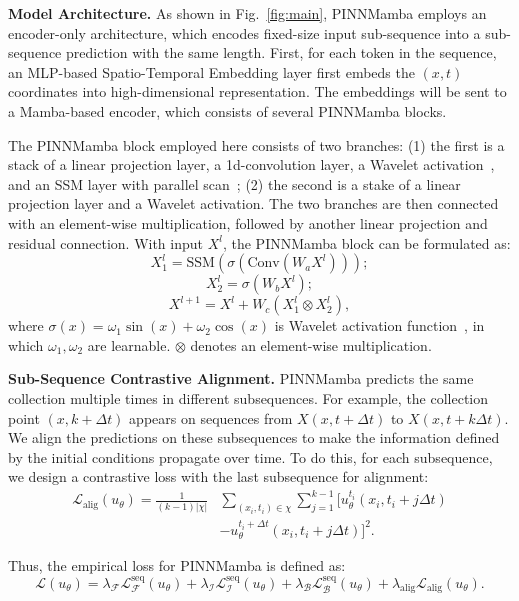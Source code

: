 \textbf{Model Architecture.} As shown in Fig.~\ref{fig:main}, PINNMamba employs an encoder-only architecture, which encodes fixed-size input sub-sequence into a sub-sequence prediction with the same length. First, for each token in the sequence, an MLP-based Spatio-Temporal Embedding layer first embeds the $(x,t)$ coordinates into high-dimensional representation. The embeddings will be sent to a Mamba-based encoder, which consists of several PINNMamba blocks. 

The PINNMamba block employed here consists of two branches: (1) the first is a stack of a linear projection layer, a 1d-convolution layer, a Wavelet activation~\cite{zhao2024pinnsformer}, and an SSM layer with parallel scan~\cite{gu2023mamba}; (2) the second is a stake of a linear projection layer and a Wavelet activation. The two branches are then connected with an element-wise multiplication, followed by another linear projection and residual connection. With input $X^l$,
the PINNMamba block can be formulated as: 
\begin{equation}
    X_1^l = \text{SSM}(\sigma(\text{Conv}(W_aX^l)));
\end{equation}
\vspace{-5mm}
\begin{equation}
    X_2^l = \sigma(W_bX^l);
\end{equation}
\vspace{-5mm}
\begin{equation}
    X^{l+1} = X^l+W_c(X_1^l\otimes X_2^l),
\end{equation}
where $\sigma(x)=\omega_1\sin(x)+\omega_2\cos(x)$ is Wavelet activation function~\cite{zhao2024pinnsformer}, in which $\omega_1,\omega_2$ are learnable. $\otimes$ denotes an element-wise multiplication. 

\textbf{Sub-Sequence Contrastive Alignment.} PINNMamba predicts the same collection multiple times in different subsequences. For example, the collection point $(x,k+\Delta t)$ appears on sequences from $X(x,t+\Delta t)$ to $X(x,t+k\Delta t)$. We align the predictions on these subsequences to make the information defined by the initial conditions propagate over time. To do this, for each subsequence, we design a contrastive loss with the last subsequence for alignment:
\begin{align}
        \mathcal L_\text{alig}(u_\theta)= \frac{1}{(k-1)|\chi|}&\sum_{(x_i,t_i)\in \chi} \sum_{j=1}^{k-1} \Big[u_\theta^{t_i}(x_i,t_i+j\Delta t)\nonumber\\&-u_\theta^{t_i+\Delta t}(x_i,t_i+j\Delta t)\Big]^2.
\end{align}
\normalsize

Thus, the empirical loss for PINNMamba is defined as:
\small
\begin{equation}
     \mathcal L(u_\theta)=\lambda_{\mathcal F}\mathcal L_{\mathcal F}^\text{seq}(u_\theta)+\lambda_{\mathcal I}\mathcal L_{\mathcal I}^\text{seq}(u_\theta)+\lambda_{\mathcal B}\mathcal L_{\mathcal B}^\text{seq}(u_\theta)+\lambda_\text{alig}\mathcal L_\text{alig}(u_\theta).
\end{equation}
\vspace{-8mm}
    

\normalsize